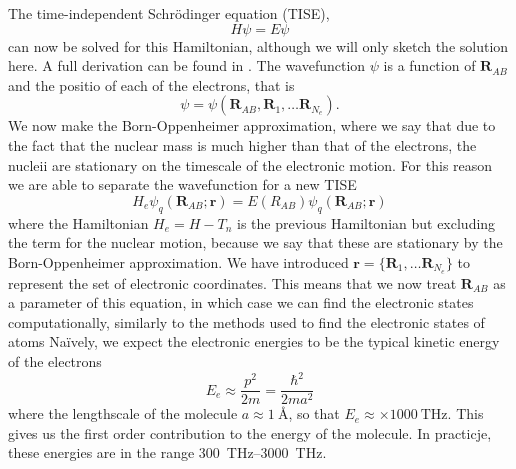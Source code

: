 The time-independent Schr\"odinger equation (TISE),
%
\begin{equation}
  H\psi = E\psi
\end{equation}
%
can now be solved for this Hamiltonian, although we will only sketch the
solution here. A full derivation can be found in \inlineref{}. The wavefunction
$\psi$ is a function of $\mathbf{R}_{AB}$ and the positio of each of the
electrons, that is
%
\begin{equation}
  \psi = \psi(\mathbf{R}_{AB}, \mathbf{R}_1, \dots \mathbf{R}_{N_e}).
\end{equation}
%
We now make the Born-Oppenheimer approximation, where we say that due to the
fact that the nuclear mass is much higher than that of the electrons, the
nucleii are stationary on the timescale of the electronic motion. For this
reason we are able to separate the wavefunction for a new TISE
%
\begin{equation}
  H_e \psi_q(\mathbf{R}_{AB}; \mathbf{r}) = E(R_{AB})\psi_q(\mathbf{R}_{AB};
  \mathbf{r})
  \label{theory:eqn:TISEelectron}
\end{equation}
%
where the Hamiltonian $H_e = H - T_n$ is the previous Hamiltonian but excluding
the term for the nuclear motion, because we say that these are stationary by
the Born-Oppenheimer approximation. We have introduced $\mathbf{r} =
\{\mathbf{R}_1, \dots \mathbf{R}_{N_e} \}$ to represent the set of electronic
coordinates. This means that we now treat $\mathbf{R}_{AB}$ as a parameter of
this equation, in which case we can find the electronic states computationally,
similarly to the methods used to find the electronic states of atoms
%
Na\"ively, we expect the electronic energies to be the typical kinetic energy
of the electrons
%
\begin{equation}
  E_e \approx \frac{p^2}{2m} = \frac{\hbar^2}{2ma^2}
\end{equation}
%
where the lengthscale of the molecule $a \approx \SI{1}{\angstrom}$, so that
$E_e \approx \times \SI{1000}{\tera\hertz}$. This gives us the first order
contribution to the energy of the molecule. In practicje, these energies are in
the range \SIrange{300}{3000}{\tera\hertz}. 

